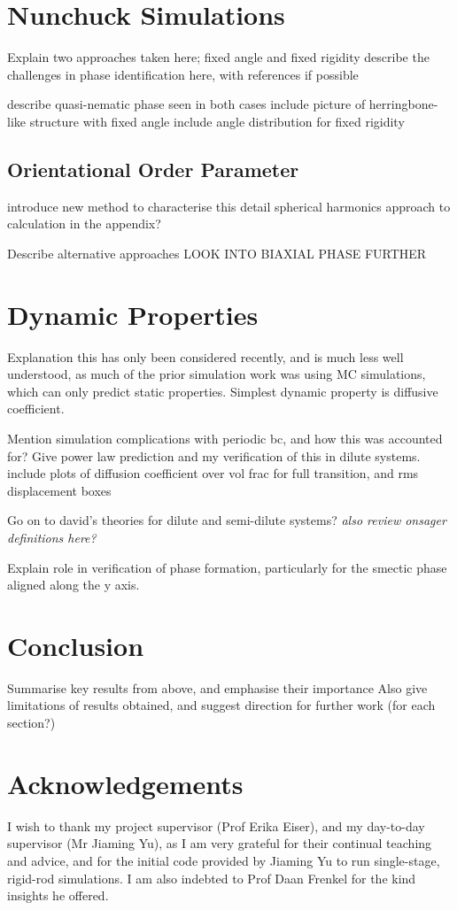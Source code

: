 \documentclass[11pt, a4paper]{article} %
\begin{document}
\section{Nunchuck Simulations}
Explain two approaches taken here; fixed angle and fixed rigidity
describe the challenges in phase identification here, with references if possible


describe quasi-nematic phase seen in both cases
include picture of herringbone-like structure with fixed angle
include angle distribution for fixed rigidity

\subsection{Orientational Order Parameter}
introduce new method to characterise this
detail spherical harmonics approach to calculation in the appendix?

Describe alternative approaches
LOOK INTO BIAXIAL PHASE FURTHER

\section{Dynamic Properties}
Explanation this has only been considered recently, and is much less well understood, as much of the prior simulation work was using MC simulations, which can only predict static properties.
Simplest dynamic property is diffusive coefficient.

Mention simulation complications with periodic bc, and how this was accounted for?
Give power law prediction and my verification of this in dilute systems.
include plots of diffusion coefficient over vol frac for full transition, and rms displacement boxes

Go on to david's theories for dilute and semi-dilute systems? \textit{also review onsager definitions here?}

Explain role in verification of phase formation, particularly for the smectic phase aligned along the y axis.
\section{Conclusion}
Summarise key results from above, and emphasise their importance 
Also give limitations of results obtained, and suggest direction for further work (for each section?)

\section*{Acknowledgements}
I wish to thank my project supervisor (Prof Erika Eiser), and my day-to-day supervisor (Mr Jiaming Yu), as I am very grateful for their continual teaching and advice, and for the initial code provided by Jiaming Yu to run single-stage, rigid-rod simulations. I am also indebted to Prof Daan Frenkel for the kind insights he offered.
\end{document}

